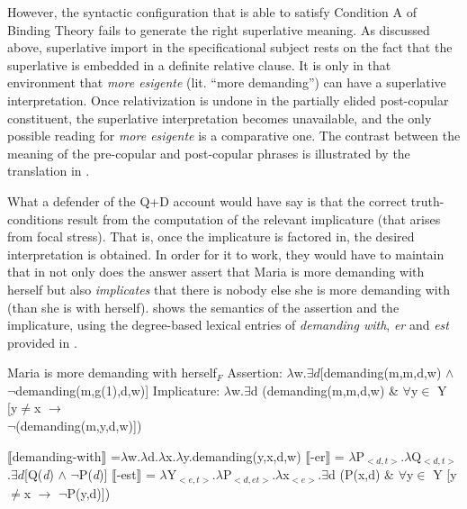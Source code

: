 \documentclass[output=paper,colorlinks,citecolor=brown,draft,draftmode]{langscibook}
\begin{document}
However, the syntactic configuration that is able to satisfy Condition A of Binding Theory fails to generate the right superlative meaning. As discussed above, superlative import in the specificational subject rests on the fact that the superlative is embedded in a definite relative clause. It is only in that environment that \textit{more esigente} (lit. ``more demanding'') can have a superlative interpretation. Once relativization is undone in the partially elided post-copular constituent, the superlative interpretation becomes unavailable, and the only possible reading for \textit{more esigente} is a comparative one. The contrast between the meaning of the pre-copular and post-copular phrases is illustrated by the translation in .


What a defender of the Q+D account would have say is that the correct truth-conditions result from the computation of the relevant implicature (that arises from focal stress). That is, once the implicature is factored in, the desired interpretation is obtained.
In order for it to work, they would have to maintain that in  not only does the answer assert that Maria is more demanding with herself but also \textit{implicates} that there is nobody else she is more demanding with (than she is with herself).   shows the semantics of the assertion and the implicature, using the degree-based lexical entries of \textit{demanding with}, \textit{er} and \textit{est} provided in .


\ea \label{mariaimplicature}\ea \label{statementmaria}Maria is more demanding with herself$_F$
\ex \label{normalvalue}Assertion: $\lambda$w.$\exists d$[demanding(m,m,d,w) $\wedge$ $\neg$demanding(m,g(1),d,w)]
\ex \label{implicature}Implicature: $\lambda$w.$\exists$d (demanding(m,m,d,w) \& $\forall$y$\in$ Y [y$\neq$x $\rightarrow$\\ $\neg$(demanding(m,y,d,w)])
\z
\z

\ea \label{denotationdegree}\ea $\llbracket$demanding-with$\rrbracket$ =$\lambda$w.$\lambda$d.$\lambda$x.$\lambda$y.demanding(y,x,d,w)
\ex $\llbracket$-er$\rrbracket$ = $\lambda$P$_{<d,t>}$.$\lambda$Q$_{<d,t>}$.$\exists d$[Q(\textit{d}) $\wedge$ $\neg$P(\textit{d})]
 \hfill \citep{bhatt2011reduced}
\ex $\llbracket$-est$\rrbracket$ =  $\lambda$Y$_{<e,t>}$.$\lambda$P$_{<d,et>}$.$\lambda$x$_{<e>}$.$\exists$d (P(x,d) \& $\forall$y$\in$ Y [y$\neq$x $\rightarrow$ $\neg$P(y,d)]) \\\hfill \citep{heim1999notes}
\z
\z
\end{document}
